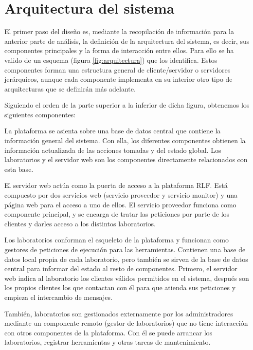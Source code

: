 

\section{Arquitectura del sistema}
El primer paso del diseño es, mediante la recopilación de 
información para la anterior parte de análisis, la definición de la 
arquitectura del sistema, es decir, sus componentes principales y la 
forma de interacción entre ellos. Para ello se ha valido de un esquema 
(figura \ref{fig:arquitectura}) que los identifica. Estos componentes 
forman una estructura general de cliente/servidor o servidores 
jerárquicos, aunque cada componente implementa en su interior otro 
tipo de arquitecturas que se definirán más adelante.

Siguiendo el orden de la parte superior a la inferior de dicha figura, 
obtenemos los siguientes componentes:

La plataforma se asienta sobre una base de datos central que contiene 
la información general del sistema. Con ella, los diferentes 
componentes obtienen la información actualizada de las acciones 
tomadas y del estado global. Los laboratorios y el servidor web son 
los componentes directamente relacionados con esta base.

El servidor web actúa como la puerta de acceso a la plataforma RLF. 
Está compuesto por dos servicios web (servicio proveedor y servicio 
monitor) y una página web para el acceso a uno de ellos. El servicio 
proveedor funciona como componente principal, y se encarga de tratar 
las peticiones por parte de los clientes y darles acceso a los 
distintos laboratorios.

Los laboratorios conforman el esqueleto de la plataforma y funcionan 
como gestores de peticiones de ejecución para las herramientas. 
Contienen una base de datos local propia de cada laboratorio, pero 
también se sirven de la base de datos central para informar del estado 
al resto de componentes. Primero, el servidor web indica al 
laboratorio los clientes válidos permitidos en el sistema, después 
son los propios clientes los que contactan con él para que atienda sus 
peticiones y empieza el intercambio de mensajes.

También, laboratorios son gestionados externamente por los administradores 
mediante un componente remoto (gestor de laboratorios) que no tiene 
interacción con otros componentes de la plataforma. Con él se puede 
arrancar los laboratorios, registrar herramientas y otras tareas de 
mantenimiento.

